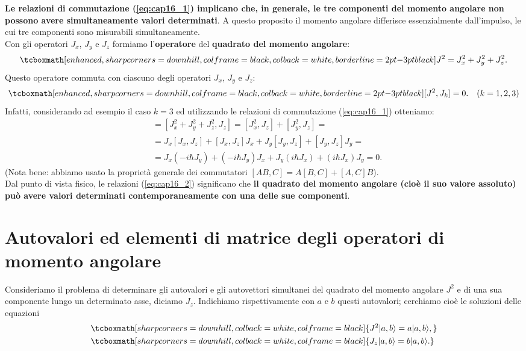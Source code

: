 \documentclass[a4paper,12pt,oneside]{book}
\begin{document}
\textbf{Le relazioni di commutazione (\ref{eq:cap16_1}) implicano che, in generale, le tre componenti del momento angolare non possono avere simultaneamente valori determinati}. A questo proposito il momento angolare differisce essenzialmente dall'impulso, le cui tre componenti sono misurabili simultaneamente.\\
		
Con gli operatori $J_x$, $J_y$ e $J_z$ formiamo l'\textbf{operatore} del \textbf{quadrato del momento angolare}:
	\begin{equation}
		\tcboxmath[enhanced, sharp corners=downhill, colframe=black, colback=white, borderline={2pt}{-3pt}{black}]{
			J^2 = J_x ^2 + J_y ^2 + J_z ^2.
			}
	\end{equation}
Questo operatore commuta con ciascuno degli operatori $J_x$, $J_y$ e $J_z$:
	\begin{equation}
		\tcboxmath[enhanced, sharp corners=downhill, colframe=black, colback=white, borderline={2pt}{-3pt}{black}]{
			[J^2, J_k]=0.
			} \quad (k=1,2,3)
	\label{eq:cap16_2}
	\end{equation}
Infatti, considerando ad esempio il caso $k=3$ ed utilizzando le relazioni di commutazione (\ref{eq:cap16_1}) otteniamo:
	\begin{align}
		[J^2, J_z] &= [J_x ^2+J_y^2+J_z ^2, J_z] = [J_x ^2, J_z]+[J_y ^2, J_z]= \nonumber \\
	& = J_x[J_x, J_z]+[J_x, J_z]J_x+J_y[J_y, J_z]+[J_y, J_z]J_y =  \nonumber \\
	& =  J_x (-i\hbar J_y)+ (-i\hbar J_y)J_x+ J_y (i\hbar J_x)+(i\hbar J_x)J_y =  0.  
	\end{align}
(Nota bene: abbiamo usato la proprietà generale dei commutatori $[AB,C]=A[B,C]+[A,C]B$).\\

Dal punto di vista fisico, le relazioni (\ref{eq:cap16_2}) significano che \textbf{il quadrato del momento angolare (cioè il suo valore assoluto) può avere valori determinati contemporaneamente con una delle sue componenti}.
\section[Autovalori ed elementi di matrice degli operatori di momento angolare]{Autovalori ed elementi di matrice degli operatori di momento angolare}
Consideriamo il problema di determinare gli autovalori e gli autovettori simultanei del quadrato del momento angolare $J^2$ e di una sua componente lungo un determinato asse, diciamo $J_z$. Indichiamo rispettivamente con $a$ e $b$ questi autovalori;  cerchiamo cioè le soluzioni delle equazioni
	\begin{align}
		&\tcboxmath[sharp corners=downhill, colback=white, colframe=black]{ J^2 \vert a, b \rangle = a \vert a, b \rangle ,} \\
		& \tcboxmath[sharp corners=downhill, colback=white, colframe=black]{ J_z \vert a, b \rangle = b \vert a, b \rangle .}
	\end{align}\\
	
\end{document}
